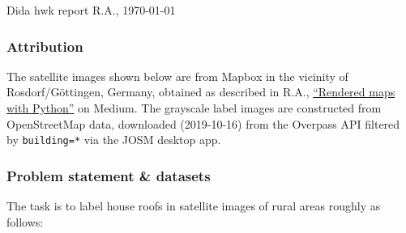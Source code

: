 \documentclass[12pt,a4paper]{article}
\begin{document}
    
    Dida hwk report
    \hfill
    R.A., \today
    
    \subsubsection*{Attribution}
    
    The satellite images shown below are from Mapbox
    in the vicinity of Rosdorf/G\"ottingen, Germany,
    obtained as described in 
    R.A., \href{https://medium.com/@busybus/rendered-maps-with-python-ffba4b34101c}{``Rendered maps with Python''} on Medium.
    The grayscale label images are constructed 
    from OpenStreetMap data,
    downloaded (2019-10-16) from the Overpass API
    filtered by \texttt{building=*}
    via 
    the JOSM desktop app.
    
    \subsubsection*{Problem statement \& datasets}
    
    The task is to label house roofs in satellite images of 
    rural areas roughly as follows:
    
\end{document}
